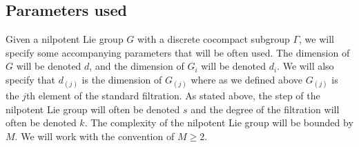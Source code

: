 \documentclass[11pt, a4paper]{amsart}
\theoremstyle{plain}
\theoremstyle{plain}
\theoremstyle{definition}
\theoremstyle{remark}
\numberwithin{equation}{section}
\numberwithin{lemma}{section}
\numberwithin{proposition}{section}
\numberwithin{corollary}{section}
\numberwithin{definition}{section}
\numberwithin{claim}{section}
\begin{document}
\subsection{Parameters used}
Given a nilpotent Lie group $G$ with a discrete cocompact subgroup $\Gamma$, we will specify some accompanying parameters that will be often used. The dimension of $G$ will be denoted $d$, and the dimension of $G_i$ will be denoted $d_i$. We will also specify that $d_{(j)}$ is the dimension of $G_{(j)}$ where as we defined above $G_{(j)}$ is the $j$th element of the standard filtration. As stated above, the step of the nilpotent Lie group will often be denoted $s$ and the degree of the filtration will often be denoted $k$. The complexity of the nilpotent Lie group will be bounded by $M$. We will work with the convention of $M \ge 2$.
\end{document}
